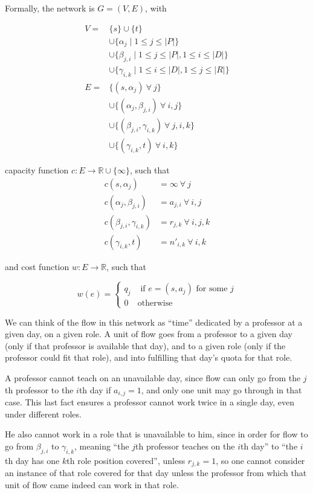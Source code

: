 Formally, the network is $G = (V, E)$, with

\begin{align*}
V = &\{s\} \cup \{t\}\\
&\cup \{\alpha_j \mid 1 \le j \le |P|\}\\
&\cup \{\beta_{j, i} \mid 1 \le j \le |P|, 1 \le i \le |D|\}\\
&\cup \{\gamma_{i, k} \mid 1 \le i \le |D|, 1 \le j \le |R|\}\\
E = &\{(s, \alpha_j)\ \forall\ j\}\\
    &\cup \{(\alpha_j, \beta_{j, i})\ \forall\ i, j \}\\
    &\cup \{(\beta_{j, i}, \gamma_{i, k})\ \forall\ j, i, k\}\\
    &\cup \{(\gamma_{i, k}, t)\ \forall\ i, k \}
\end{align*}

capacity function $c:E \to \mathbb{R} \cup \{\infty\}$, such that
\begin{align*}
c(s, \alpha_j) &= \infty\ \forall\ j\\
c(\alpha_j, \beta_{j, i}) &= a_{j, i}\ \forall\ i, j\\
c(\beta_{j, i}, \gamma_{i, k}) &= r_{j, k}\ \forall\ i, j, k\\
c(\gamma_{i, k}, t) &= n'_{i, k}\ \forall\ i, k
\end{align*}

and cost function $w:E \to \mathbb{R}$, such that

$$
w(e) =
\begin{cases}
q_j &\text{ if } e = (s, a_j) \text{ for some }j\\
0 & \text{otherwise}
\end{cases}
$$

We can think of the flow in this network as ``time'' dedicated by a professor at a given day, on a given role. A unit of flow goes from a professor to a given day (only if that professor is available that day), and to a given role (only if the professor could fit that role), and into fulfilling that day's quota for that role.

A professor cannot teach on an unavailable day, since flow can only go from the $j$th professor to the $i$th day if $a_{i, j} = 1$, and only one unit may go through in that case. This last fact ensures a professor cannot work twice in a single day, even under different roles.

He also cannot work in a role that is unavailable to him, since in order for flow to go from $\beta_{j, i}$ to $\gamma_{i, k}$, meaning ``the $j$th professor teaches on the $i$th day'' to ``the $i$th day has one $k$th role position covered'', unless $r_{j, k} = 1$, so one cannot consider an instance of that role covered for that day unless the professor from which that unit of flow came indeed can work in that role.


